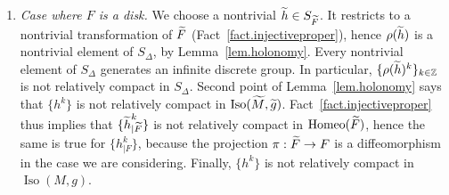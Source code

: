 \documentclass[11pt]{article}
\theoremstyle{definition}
\numberwithin{equation}{section}
\numberwithin{figure}{section}
\numberwithin{table}{section}
\DeclareMathOperator{\Iso}{Iso}
\DeclareMathOperator{\Homeo}{Homeo}
\newcommand{\tm}{\tilde{{M}}}
\newcommand{\tF}{\tilde{{F}}}
\newcommand{\tth}{\tilde{h}}
\newcommand*\ZZ{\mathbb{Z}}
\let\oldtilde\tilde
\renewcommand*\tilde[1]{\mathchoice{\widetilde{#1}}{\widetilde{#1}}{\widetilde{#1}}{\oldtilde{#1}}}
\newcommand*{\alphenumi}{\renewcommand*{\theenumi}{\alph{enumi}}}
\begin{document}
\begin{enumerate}\alphenumi
\item \label{listprf8.15.a}\emph{Case where $F$ is a disk.} We choose a nontrivial $\tth \in S_{\tF}$. It restricts to a nontrivial transformation of $\tF$ (Fact~\ref{fact.injectiveproper}), hence $\rho(\tth)$ is a nontrivial element of $S_{\Delta}$, by Lemma~\ref{lem.holonomy}. Every nontrivial element of $S_{\Delta}$ generates an infinite discrete group. In particular, $\{\rho(\tth)^k\}_{k \in \ZZ}$ is not relatively compact in $S_{\Delta}$. Second point of Lemma~\ref{lem.holonomy} says that $\{h ^k \}$ is not relatively compact in $\Iso(\tm,\tilde{g})$. Fact~\ref{fact.injectiveproper} thus implies that $\{{\tth}^k_{|\tF}\}$ is not relatively compact in $\Homeo(\tF)$, hence the same is true for $\{h_{|F}^k \}$, because the projection $\pi: \tF\to F$ is a diffeomorphism in the case we are considering. Finally, $\{ h^k \}$ is not relatively compact in $\Iso(M,g)$.


\end{enumerate}
\end{document}
